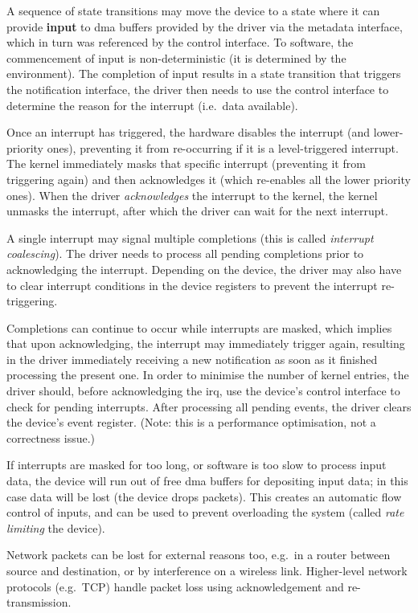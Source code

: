 \documentclass[a4paper,12pt]{report}
\begin{document}
A sequence of state transitions may move the device to a state where
it can provide \textbf{input} to \gls{dma} buffers provided by the driver via the metadata
interface, which in turn was referenced by the control interface. To
software, the commencement of input is
non-deterministic (it is determined by the environment). The completion of
input results in a state transition that triggers the notification
interface, the driver then needs to use the control interface to
determine the reason for the interrupt (i.e.\ data available).

Once an interrupt has triggered, the hardware disables the interrupt
(and lower-priority ones), preventing it from re-occurring if it is a
level-triggered interrupt. The kernel
immediately masks that specific interrupt (preventing
it from triggering again) and then acknowledges it (which re-enables
all the lower priority ones).
When the driver \emph{acknowledges} the interrupt to the
kernel, the kernel unmasks the interrupt, after which the driver can
wait for the next interrupt.

A single interrupt
may signal multiple completions (this is called \emph{interrupt
  coalescing}). The driver needs to process all pending completions
prior to acknowledging the interrupt. Depending on the device, the
driver may also have to clear interrupt conditions in the device
registers to prevent the interrupt re-triggering.

Completions can continue to occur while interrupts are masked, which
implies that upon acknowledging, the interrupt may immediately trigger
again, resulting in the driver immediately receiving a new
notification as soon as it finished processing the present one. In
order to minimise the number of kernel entries, the driver should,
before acknowledging the \gls{irq}, use the device's control interface to
check for pending interrupts. After processing all pending events,
the driver clears the device's event register. (Note: this is a performance
optimisation, not a correctness issue.)

If interrupts are masked for too long, or software is too slow to
process input data, the device will run out of free \gls{dma} buffers
for depositing input data; in this case data will be lost
(the device drops packets). This creates an automatic flow control of inputs,
and can be used to prevent overloading the system (called \emph{rate
  limiting} the device).

Network packets can be lost for external reasons too, e.g.\ in a
router between source and destination, or by interference on a
wireless link. Higher-level network protocols
(e.g.\ TCP) handle packet loss using acknowledgement and re-transmission.
\end{document}
